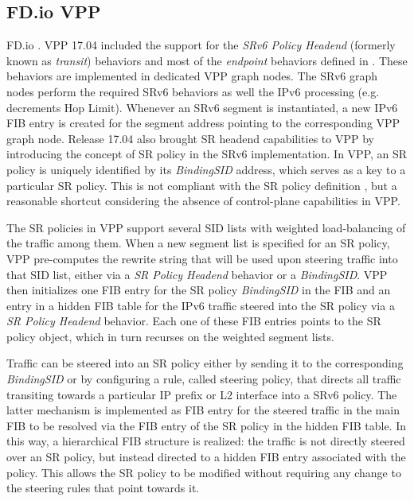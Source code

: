 \subsection{FD.io VPP}
\label{sec:vpp}

FD.io . VPP  17.04 included the support for the \textit{SRv6 Policy Headend} (formerly known as \textit{transit}) behaviors and most of the \textit{endpoint} behaviors defined in \cite{id-srv6-network-prog}. These behaviors are implemented in dedicated VPP graph nodes. The SRv6 graph nodes perform the required SRv6 behaviors as well the IPv6 processing (e.g. decrements Hop Limit). Whenever an SRv6 segment is instantiated, a new IPv6 FIB entry is created for the segment address pointing to the corresponding VPP graph node. Release 17.04 also brought SR headend capabilities to VPP by introducing the concept of SR policy in the SRv6 implementation. In VPP, an SR policy is uniquely identified by its \textit{BindingSID} address, which serves as a key to a particular SR policy. This is not compliant with the SR policy definition \cite{id-segment-routing-policy}, but a reasonable shortcut considering the absence of control-plane capabilities in VPP. 

The SR policies in VPP support several SID lists with weighted load-balancing of the traffic among them. When a new segment list is specified for an SR policy, VPP pre-computes the rewrite string that will be used upon steering traffic into that SID list, either via a \textit{SR Policy Headend} behavior or a \textit{BindingSID}. VPP then initializes one FIB entry for the SR policy \textit{BindingSID} in the FIB and an entry in a hidden FIB table for the IPv6 traffic steered into the SR policy via a \textit{SR Policy Headend} behavior. Each one of these FIB entries points to the SR policy object, which in turn recurses on the weighted segment lists.

Traffic can be steered into an SR policy either by sending it to the corresponding \textit{BindingSID} or by configuring a rule, called steering policy, that directs all traffic transiting towards a particular IP prefix or L2 interface into a SRv6 policy. The latter mechanism is implemented as FIB entry for the steered traffic in the main FIB to be resolved via the FIB entry of the SR policy in the hidden FIB table. In this way, a hierarchical FIB structure is realized: the traffic is not directly steered over an SR policy, but instead directed to a hidden FIB entry associated with the policy. This allows the SR policy to be modified without requiring any change to the steering rules that point towards it.

